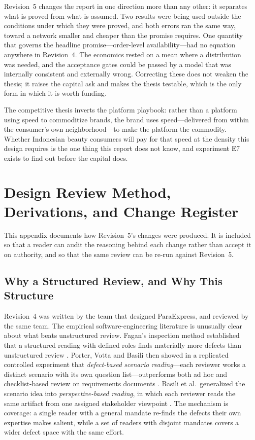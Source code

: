 \documentclass[10pt,twocolumn,letterpaper]{article}
\renewcommand{\thesection}{\Roman{section}}
\renewcommand{\thesubsection}{\Alph{subsection}}
\newcommand{\appendices}{\par\setcounter{section}{0}\setcounter{subsection}{0}%
  \renewcommand{\thesection}{\Alph{section}}%
  \renewcommand{\thesubsection}{\thesection-\Alph{subsection}}%
  \titleformat{\section}[block]{\centering\normalsize\scshape}{Appendix~\thesection}{0.6em}{}}
\theoremstyle{definition}
\begin{document}
Revision~5 changes the report in one direction more than any other: it separates what is proved from what is assumed. Two results were being used outside the conditions under which they were proved, and both errors ran the same way, toward a network smaller and cheaper than the promise requires. One quantity that governs the headline promise---order-level availability---had no equation anywhere in Revision~4. The economics rested on a mean where a distribution was needed, and the acceptance gates could be passed by a model that was internally consistent and externally wrong. Correcting these does not weaken the thesis; it raises the capital ask and makes the thesis testable, which is the only form in which it is worth funding.

The competitive thesis inverts the platform playbook: rather than a platform using speed to commoditize brands, the brand uses speed---delivered from within the consumer's own neighborhood---to make the platform the commodity. Whether Indonesian beauty consumers will pay for that speed at the density this design requires is the one thing this report does not know, and experiment E7 exists to find out before the capital does.

\appendices

\section{Design Review Method, Derivations, and Change Register}

This appendix documents how Revision~5's changes were produced. It is included so that a reader can audit the reasoning behind each change rather than accept it on authority, and so that the same review can be re-run against Revision~5.

\subsection{Why a Structured Review, and Why This Structure}

Revision~4 was written by the team that designed ParaExpress, and reviewed by the same team. The empirical software-engineering literature is unusually clear about what beats unstructured review. Fagan's inspection method established that a structured reading with defined roles finds materially more defects than unstructured review \cite{fagan1976}. Porter, Votta and Basili then showed in a replicated controlled experiment that \emph{defect-based scenario reading}---each reviewer works a distinct scenario with its own question list---outperforms both ad hoc and checklist-based review on requirements documents \cite{porter1995}. Basili et al.\ generalized the scenario idea into \emph{perspective-based reading}, in which each reviewer reads the same artifact from one assigned stakeholder viewpoint \cite{basili1996}. The mechanism is coverage: a single reader with a general mandate re-finds the defects their own expertise makes salient, while a set of readers with disjoint mandates covers a wider defect space with the same effort.
\end{document}

